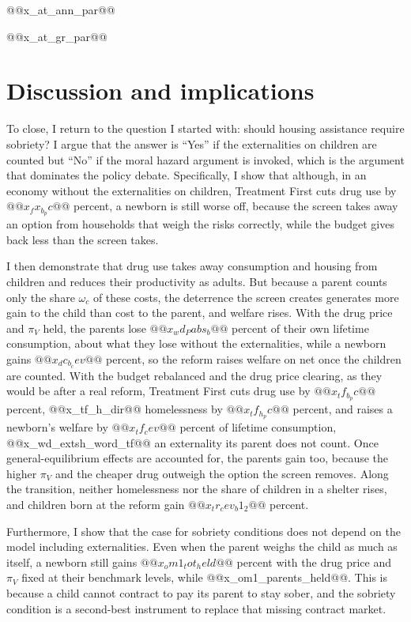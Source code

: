 \documentclass[10pt]{article}
\begin{document}
@@x_at_ann_par@@

@@x_at_gr_par@@

\section{Discussion and implications}\label{sec:discussion}

To close, I return to the question I started with: should housing assistance require sobriety?   I argue that the answer is  ``Yes'' if the externalities on children are counted but ``No'' if the moral hazard argument is invoked, which is the argument that dominates the policy debate.   Specifically, I show that although, in an economy without the externalities on children, Treatment First cuts drug use by $@@x_fx_b_pc@@$ percent, a newborn is still worse off, because the screen takes away an option from households that weigh the risks correctly, while the budget gives back less than the screen takes.

 I  then demonstrate that drug use takes away consumption and housing from children and reduces their productivity as adults.  But because a parent counts only the share $\omega_c$ of these costs, the deterrence the screen creates generates more gain to the child than cost to the parent, and welfare rises. With the drug price and $\pi_V$ held, the parents lose $@@x_wd_Pabs_b@@$ percent of their own lifetime consumption, about what they lose without the externalities, while a newborn gains $@@x_dc_b_cev@@$ percent, so the reform raises welfare on net once the children are counted. With the budget rebalanced and the drug price clearing, as they would be after a real reform, Treatment First cuts drug use by $@@x_tf_b_pc@@$ percent, @@x_tf_h_dir@@ homelessness by $@@x_tf_h_pc@@$ percent, and raises a newborn's welfare by $@@x_tf_cev@@$ percent of lifetime consumption, @@x_wd_extsh_word_tf@@ an externality its parent does not count. Once general-equilibrium effects are accounted for, the parents gain too, because the higher $\pi_V$ and the cheaper drug outweigh the option the screen removes. Along the transition, neither homelessness nor the share of children in a shelter rises, and children born at the reform gain $@@x_tr_cev_b1_2@@$ percent.

 Furthermore, I show that the case for sobriety conditions does not  depend on the  model including externalities.  Even when the parent weighs the child  as much as itself, a newborn still gains $@@x_om1_tot_held@@$ percent with the drug price and $\pi_V$  fixed at their benchmark levels, while @@x_om1_parents_held@@.  This is because a child cannot contract to pay its parent to  stay sober, and the sobriety condition  is a second-best instrument to replace that missing contract  market.
\end{document}
